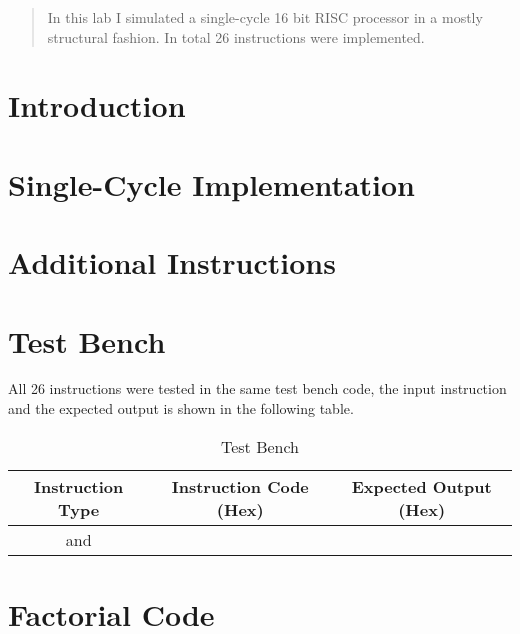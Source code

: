 \documentclass[11pt]{article}
\begin{document}
  
  
  \begin{abstract}
  In this lab I simulated a single-cycle 16 bit RISC processor in a mostly structural fashion. In total 26 instructions were implemented.
  \end{abstract}

  \section{Introduction}

  \section{Single-Cycle Implementation}

  \section{Additional Instructions}

  \section{Test Bench}

  All 26 instructions were tested in the same test bench code, the input instruction and the expected output is shown in the following table.

    \begin{table}[h]
      \centering
      \begin{tabular}{|c|c|c|}
       \hline
       Instruction Type & Instruction Code (Hex) & Expected Output (Hex)\\
       \hline\hline
       and & & \\
       \hline
      \end{tabular}
      \caption{Test Bench}
      \label{tab:test_bench}
    \end{table}

  \section{Factorial Code}
\end{document}
